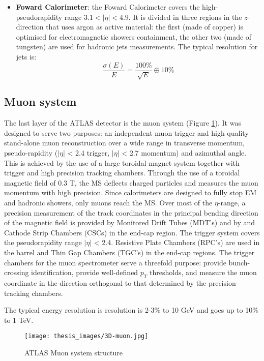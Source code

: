 \documentclass[a4paper, oneside, 11pt, openright]{book}
\begin{document}
\begin{itemize}
					\item \textbf{Foward Calorimeter}: the Foward Calorimeter \cite{LArCalo_report} covers the high-pseudorapidity range $3.1 < |\eta| < 4.9$. It is divided in three regions in the $z$-direction that uses argon as active material: the first (made of copper) is optimised for electromagnetic showers containment, the other two (made of tungsten) are used for hadronic jets measurements. The typical resolution for jets is:
					$$ 
					\frac{\sigma(E)}{E} = \frac{100\%}{\sqrt{E}} \oplus 10\%
					$$
				\end{itemize}
			\subsection{Muon system}
				The last layer of the ATLAS detector is the muon system	\cite{muon_report} (Figure \ref{fig:muon detector}). It was designed to serve two purposes: an independent muon trigger and high quality stand-alone muon reconstruction over a wide range in transverse momentum, pseudo-rapidity ($|\eta|$ < 2.4 trigger, $|\eta|$ < 2.7 momentum) and azimuthal angle. This is achieved by the use of a large toroidal magnet system together with trigger and high precision tracking chambers. Through the use of a toroidal magnetic field of 0.3 T, the MS deflects charged particles and measures the muon momentum with high precision. Since calorimeters are designed to fully stop EM and hadronic showers, only muons reach the MS. Over most of the $\eta$-range, a precision measurement of the track coordinates in the principal bending direction of the magnetic field is provided by Monitored Drift Tubes (MDT’s) and by and Cathode Strip Chambers (CSCs) in the end-cap region. The trigger system covers the pseudorapidity range $|\eta|$ < 2.4. Resistive Plate Chambers (RPC’s) are used in the barrel and Thin Gap Chambers (TGC’s) in the end-cap regions. The trigger chambers for the muon spectrometer serve a threefold purpose: provide bunch-crossing identification, provide well-defined $p_T$ thresholds, and measure the muon coordinate in the direction orthogonal to that determined by the precision-tracking chambers.
				
				The typical energy resolution is resolution is 2-3\% to 10 GeV and goes up to 10\% to 1 TeV.
				\begin{figure}
					\centering
					\texttt{[image: thesis\_images/3D-muon.jpg]}
					\caption{ATLAS Muon system structure}
					\label{fig:muon detector}
				\end{figure}
			
\end{document}
